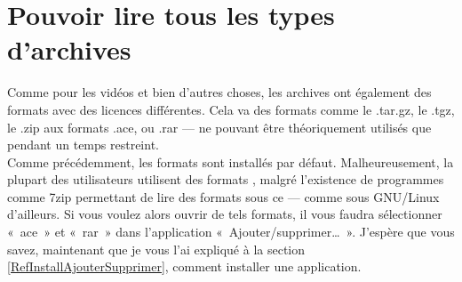 \section{Pouvoir lire tous les types d'archives}
Comme pour les vidéos et bien d'autres choses, les archives ont également des formats avec des licences différentes. Cela va des formats  comme le .tar.gz, le .tgz, le .zip aux formats  .ace, ou .rar --- ne pouvant être théoriquement utilisés que pendant un temps restreint.\\
Comme précédemment, les formats  sont installés par défaut. Malheureusement, la plupart des utilisateurs utilisent des formats , malgré l'existence de programmes comme 7zip permettant de lire des formats  sous ce  --- comme sous GNU/Linux d'ailleurs. Si vous voulez alors ouvrir de tels formats, il vous faudra sélectionner «~ace~» et «~rar~» dans l'application «~Ajouter/supprimer\dots{}~». J'espère que vous savez, maintenant que je vous l'ai expliqué à la section \ref{RefInstallAjouterSupprimer}, comment installer une application.
